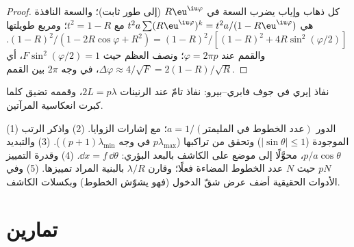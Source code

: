 \begin{proof}
كل ذهاب وإياب يضرب السعة في $R\eu^{\iu\varphi}$ (إلى طور
ثابت)؛ والسعة النافذة هي $t^2a\sum(R\eu^{\iu\varphi})^k =
t^2a/(1 - R\eu^{\iu\varphi})$ مع $t^2 = 1 - R$؛ ومربع طويلتها $(1 - R)^2/
(1 - 2R\cos\varphi + R^2) = (1 - R)^2/[(1 - R)^2 + 4R\sin^2(\varphi/2)]$. والقمم عند
$\varphi = 2\pi p$؛ ونصف العظم حيث $F\sin^2(\varphi/2) = 1$، أي $\Delta\varphi \approx
4/\sqrt F = 2(1 - R)/\sqrt R$، في وجه $2\pi$ بين القمم.
\end{proof}

\begin{omfigure}

{\small نفاذ إيري في جوف فابري--بيرو: نفاذ
تامّ عند الرنينات $2L = p\lambda$، وقممه تضيق كلما كبرت
انعكاسية المرآتين.}
\end{omfigure}

\begin{method}\label{met:b2:gratings:method}
(1) الدور $a = 1/(\text{عدد الخطوط في المليمتر})$؛  مع
إشارات الزوايا. (2) واذكر الرتب الموجودة ($|\sin\theta| \le 1$)
وتحقق من تراكبها ($p\lambda_{\max}$ في وجه $(p + 1)\lambda_{\min}$). (3)
والتبديد $p/a\cos\theta$، محوَّلًا إلى موضع على الكاشف
بالبعد البؤري: $\dd x = f\,\dd\theta$. (4) وقدرة التمييز $pN$ حيث $N$
عدد الخطوط المضاءة فعلًا؛ وقارن $\lambda/R$ بالبنية المراد
تمييزها. (5) وفي الأدوات الحقيقية أضف عرض شقّ الدخول (فهو
يشوّش الخطوط) وبكسلات الكاشف.
\end{method}

\section{تمارين}

